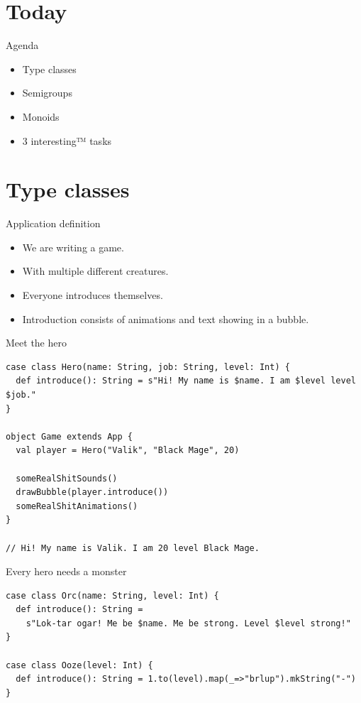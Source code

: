 \documentclass[presentation,aspectratio=169,smaller]{beamer}
\begin{document}
\section*{Today}
\label{sec:org8e5bbe7}

\begin{frame}[label={sec:org3c5577b}]{Agenda}
\begin{itemize}
\item Type classes
\item Semigroups
\item Monoids
\item 3 interesting™ tasks
\end{itemize}
\end{frame}

\section*{Type classes}
\label{sec:org138515e}

\begin{frame}[label={sec:org71b7d94}]{Application definition}
\begin{itemize}
\item We are writing a game.
\item With multiple different creatures.
\item Everyone introduces themselves.
\item Introduction consists of animations and text showing in a bubble.
\end{itemize}
\end{frame}

\begin{frame}[label={sec:orgb9c16a2},fragile]{Meet the hero}
 \begin{verbatim}
case class Hero(name: String, job: String, level: Int) {
  def introduce(): String = s"Hi! My name is $name. I am $level level $job."
}

object Game extends App {
  val player = Hero("Valik", "Black Mage", 20)

  someRealShitSounds()
  drawBubble(player.introduce())
  someRealShitAnimations()
}

// Hi! My name is Valik. I am 20 level Black Mage.
\end{verbatim}
\end{frame}

\begin{frame}[label={sec:orgbab2bb7},fragile]{Every hero needs a monster}
 \begin{verbatim}
case class Orc(name: String, level: Int) {
  def introduce(): String =
    s"Lok-tar ogar! Me be $name. Me be strong. Level $level strong!"
}

case class Ooze(level: Int) {
  def introduce(): String = 1.to(level).map(_=>"brlup").mkString("-")
}
\end{verbatim}
\end{frame}
\end{document}
